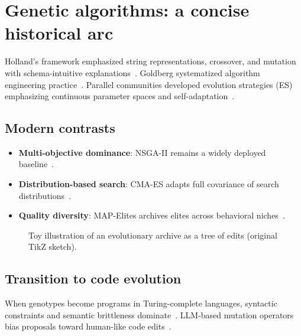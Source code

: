 \section{Genetic algorithms: a concise historical arc}
\label{sec:ga}

Holland's framework emphasized string representations, crossover, and mutation with schema-intuitive explanations~\cite{holland1975adaptation}.
Goldberg systematized algorithm engineering practice~\cite{goldberg1989genetic}.
Parallel communities developed evolution strategies (ES) emphasizing continuous parameter spaces and self-adaptation~\cite{hansen2001completely,beyer2002evolution}.

\subsection{Modern contrasts}
\begin{itemize}
  \item \textbf{Multi-objective dominance}: NSGA-II remains a widely deployed baseline~\cite{deb2002fast}.
  \item \textbf{Distribution-based search}: CMA-ES adapts full covariance of search distributions~\cite{hansen2001completely}.
  \item \textbf{Quality diversity}: MAP-Elites archives elites across behavioral niches~\cite{mouret2015illuminating}.
\end{itemize}

\begin{figure}[t]
  \centering
  
  \caption{Toy illustration of an evolutionary archive as a tree of edits (original TikZ sketch).}
  \label{fig:archive-tree}
\end{figure}

\subsection{Transition to code evolution}
When genotypes become programs in Turing-complete languages, syntactic constraints and semantic brittleness dominate~\cite{koza1992genetic}.
LLM-based mutation operators bias proposals toward human-like code edits~\cite{lange2025shinka}.
